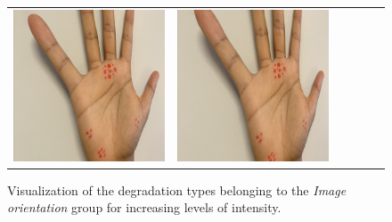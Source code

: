 \begin{figure}
{\begin{tabular}{C{5em}ccccc}
\includegraphics[width=\gridimagewidth,valign=m]{img/supplementary/orientation/perspective_right/0_perspective_right_0.6.png} & \includegraphics[width=\gridimagewidth,valign=m]{img/supplementary/orientation/perspective_right/0_perspective_right_0.8.png} \\ [6.15ex]
        \end{tabular}
    }
    \caption{Visualization of the degradation types belonging to the \textit{Image orientation} group for increasing levels of intensity.}
    \label{fig:orientation_supplementary}
\end{figure}


